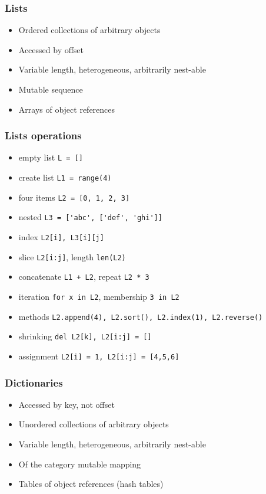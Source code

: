 \begin{frame}[fragile]\frametitle{Lists}
  \begin{itemize}
  \item Ordered collections of arbitrary objects
  \item Accessed by offset
  \item Variable length, heterogeneous, arbitrarily nest-able
  \item Mutable sequence
  \item Arrays of object references
  \end{itemize}
\end{frame}

\begin{frame}[fragile]\frametitle{Lists operations}
  \begin{itemize}
  \item empty list \lstinline{L = []}
    \item create list \lstinline{L1 = range(4)}
  \item four items \lstinline{L2 = [0, 1, 2, 3]}
  \item nested \lstinline{L3 = ['abc', ['def', 'ghi']]}
  \item index \lstinline{L2[i], L3[i][j]}
  \item slice  \lstinline{L2[i:j]}, length \lstinline{len(L2)}
  \item concatenate \lstinline{L1 + L2}, repeat \lstinline{L2 * 3}
  \item iteration \lstinline{for x in L2}, membership \lstinline{3 in L2}
  \item methods \lstinline{L2.append(4), L2.sort(), L2.index(1), L2.reverse()}
  \item shrinking \lstinline{del L2[k], L2[i:j] = []}
  \item assignment \lstinline{L2[i] = 1, L2[i:j] = [4,5,6]}

  \end{itemize}
\end{frame}

\begin{frame}[fragile]\frametitle{Dictionaries}
  \begin{itemize}
  \item Accessed by key, not offset
  \item Unordered collections of arbitrary objects
  \item Variable length, heterogeneous, arbitrarily nest-able
  \item Of the category mutable mapping
  \item Tables of object references (hash tables)
  \end{itemize}
\end{frame}


